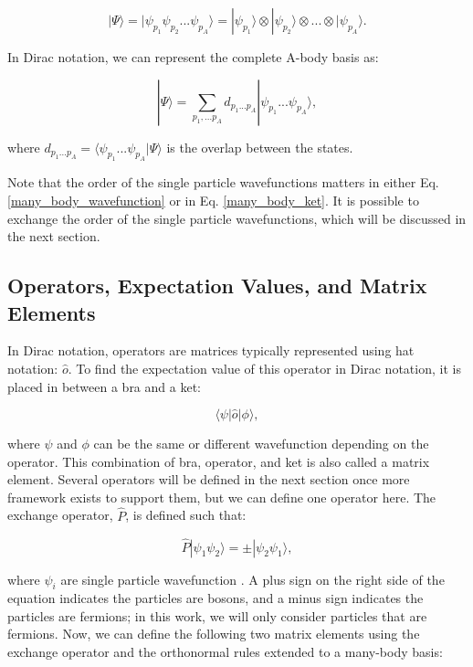 \begin{equation}\label{many_body_ket}
    |\Psi\rangle = |\psi_{p_1} \psi_{p_2} ... \psi_{p_A} \rangle = |\psi_{p_1}\rangle \otimes |\psi_{p_2}\rangle \otimes ... \otimes |\psi_{p_A}\rangle.
\end{equation}

In Dirac notation, we can represent the complete A-body basis as:

\begin{equation}
    |\Psi \rangle = \sum_{p_1,...p_A} d_{p_1...p_A}|\psi_{p_1}...\psi_{p_A}\rangle,
\end{equation}

where $d_{p_1...p_A} = \langle \psi_{p_1} ... \psi_{p_A} | \Psi \rangle$ is the overlap between the states.

Note that the order of the single particle wavefunctions matters in either Eq. \ref{many_body_wavefunction} or in Eq. \ref{many_body_ket}. It is possible to exchange the order of the single particle wavefunctions, which will be discussed in the next section.

\subsection*{Operators, Expectation Values, and Matrix Elements}

In Dirac notation, operators are matrices typically represented using hat notation: $\hat{o}$. To find the expectation value of this operator in Dirac notation, it is placed in between a bra and a ket:

\begin{equation}
    \langle \psi | \hat{o} | \phi \rangle ,
\end{equation}

where $\psi$ and $\phi$ can be the same or different wavefunction depending on the operator. This combination of bra, operator, and ket is also called a matrix element. Several operators will be defined in the next section once more framework exists to support them, but we can define one operator here. The exchange operator, $\hat{P}$, is defined such that:

\begin{equation}
    \hat{P}|\psi_1\psi_2\rangle = \pm |\psi_2\psi_1\rangle,
\end{equation}

where $\psi_i$ are single particle wavefunction \cite{Ref12}.  A plus sign on the right side of the equation indicates the particles are bosons, and a minus sign indicates the particles are fermions; in this work, we will only consider particles that are fermions. Now, we can define the following two matrix elements using the exchange operator and the orthonormal rules extended to a many-body basis:

